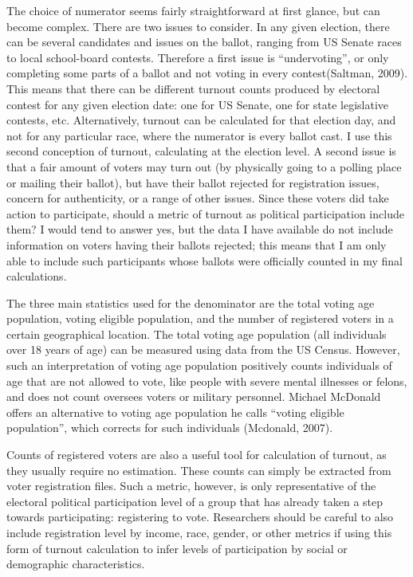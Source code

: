 \documentclass[12pt,twoside]{reedthesis}
\begin{document}
  The choice of numerator seems fairly straightforward at first glance,
  but can become complex. There are two issues to consider. In any given
  election, there can be several candidates and issues on the ballot,
  ranging from US Senate races to local school-board contests. Therefore a
  first issue is ``undervoting'', or only completing some parts of a
  ballot and not voting in every contest(Saltman, 2009). This means that
  there can be different turnout counts produced by electoral contest for
  any given election date: one for US Senate, one for state legislative
  contests, etc. Alternatively, turnout can be calculated for that
  election day, and not for any particular race, where the numerator is
  every ballot cast. I use this second conception of turnout, calculating
  at the election level. A second issue is that a fair amount of voters
  may turn out (by physically going to a polling place or mailing their
  ballot), but have their ballot rejected for registration issues, concern
  for authenticity, or a range of other issues. Since these voters did
  take action to participate, should a metric of turnout as political
  participation include them? I would tend to answer yes, but the data I
  have available do not include information on voters having their ballots
  rejected; this means that I am only able to include such participants
  whose ballots were officially counted in my final calculations.
  
  The three main statistics used for the denominator are the total voting
  age population, voting eligible population, and the number of registered
  voters in a certain geographical location. The total voting age
  population (all individuals over 18 years of age) can be measured using
  data from the US Census. However, such an interpretation of voting age
  population positively counts individuals of age that are not allowed to
  vote, like people with severe mental illnesses or felons, and does not
  count oversees voters or military personnel. Michael McDonald offers an
  alternative to voting age population he calls ``voting eligible
  population'', which corrects for such individuals (Mcdonald, 2007).
  
  Counts of registered voters are also a useful tool for calculation of
  turnout, as they usually require no estimation. These counts can simply
  be extracted from voter registration files. Such a metric, however, is
  only representative of the electoral political participation level of a
  group that has already taken a step towards participating: registering
  to vote. Researchers should be careful to also include registration
  level by income, race, gender, or other metrics if using this form of
  turnout calculation to infer levels of participation by social or
  demographic characteristics.
  
\end{document}
